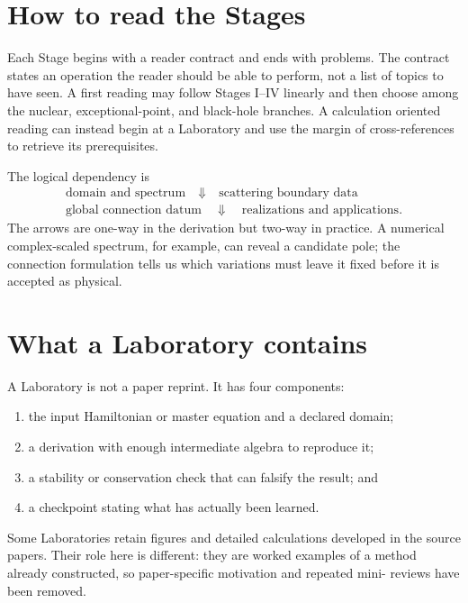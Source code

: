 
\section*{How to read the Stages}

Each Stage begins with a reader contract and ends with problems.  The contract
states an operation the reader should be able to perform, not a list of topics
to have seen.  A first reading may follow Stages I--IV linearly and then choose
among the nuclear, exceptional-point, and black-hole branches.  A calculation
oriented reading can instead begin at a Laboratory and use the margin of
cross-references to retrieve its prerequisites.

The logical dependency is
\begin{gather*}
  \boxed{\text{domain and spectrum}}
  \quad\Downarrow\quad
  \boxed{\text{scattering boundary data}}
  \\
  \boxed{\text{global connection datum}}
  \quad\Downarrow\quad
  \boxed{\text{realizations and applications}}.
\end{gather*}
The arrows are one-way in the derivation but two-way in practice.  A numerical
complex-scaled spectrum, for example, can reveal a candidate pole; the
connection formulation tells us which variations must leave it fixed before
it is accepted as physical.

\section*{What a Laboratory contains}

A Laboratory is not a paper reprint.  It has four components:
\begin{enumerate}[label=\arabic*.]
  \item the input Hamiltonian or master equation and a declared domain;
  \item a derivation with enough intermediate algebra to reproduce it;
  \item a stability or conservation check that can falsify the result; and
  \item a checkpoint stating what has actually been learned.
\end{enumerate}
Some Laboratories retain figures and detailed calculations developed in the
source papers.  Their role here is different: they are worked examples of a
method already constructed, so paper-specific motivation and repeated mini-
reviews have been removed.

